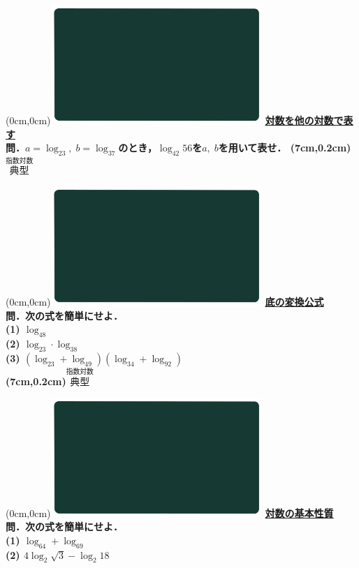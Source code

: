 \documentclass[10pt,
fleqn,
dvipdfmx,
uplatex
]{jsarticle}
\begin{document}
\at(0cm,0cm){\includegraphics[width=8cm,bb=0 0 1920 1080]{./youtube/thumbnails/templates/smart_background/指数対数.jpeg}}
{\color{orange}\bf\boldmath\Large\underline{対数を他の対数で表す}}\vspace{0.3zw}\\
\LARGE 
\bf\boldmath 問．$a=\log _23,\;b=\log _37$のとき，$\log _{42}{56}$を$a,\;b$を用いて表せ．
\at(7cm,0.2cm){\small\color{bradorange}$\overset{\text{指数対数}}{\text{典型}}$}

\newpage

\at(0cm,0cm){\includegraphics[width=8cm,bb=0 0 1920 1080]{./youtube/thumbnails/templates/smart_background/指数対数.jpeg}}
{\color{orange}\bf\boldmath\Large\underline{底の変換公式}}\vspace{0.3zw}\\
\large 
\bf\boldmath 問．次の式を簡単にせよ．\\
(1)  $\log _48$\\
(2)  $\log _23\cdot \log _38$\\
(3)  $\left(\log _23+\log _49\right)\left(\log _34+\log _92\right)$\\

\at(7cm,0.2cm){\small\color{bradorange}$\overset{\text{指数対数}}{\text{典型}}$}

\newpage

\at(0cm,0cm){\includegraphics[width=8cm,bb=0 0 1920 1080]{./youtube/thumbnails/templates/smart_background/指数対数.jpeg}}
{\color{orange}\bf\boldmath\Large\underline{対数の基本性質}}\vspace{0.3zw}\\
\LARGE
\bf\boldmath 問．次の式を簡単にせよ．\\
(1)  $\log _64+\log _69$\\
(2)  $4\log _2\sqrt 3-\log _2{18}$\\
\end{document}
